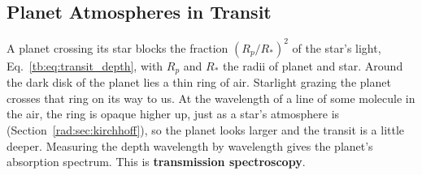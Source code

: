 \subsection{Planet Atmospheres in Transit}
\label{rad:sec:transmission}

A planet crossing its star blocks the fraction $(R_p/R_*)^2$ of the star's light, Eq.~\eqref{tb:eq:transit_depth}, with $R_p$ and $R_*$ the radii of planet and star. Around the dark disk of the planet lies a thin ring of air. Starlight grazing the planet crosses that ring on its way to us. At the wavelength of a line of some molecule in the air, the ring is opaque higher up, just as a star's atmosphere is (Section~\ref{rad:sec:kirchhoff}), so the planet looks larger and the transit is a little deeper. Measuring the depth wavelength by wavelength gives the planet's absorption spectrum. This is \textbf{transmission spectroscopy}.

